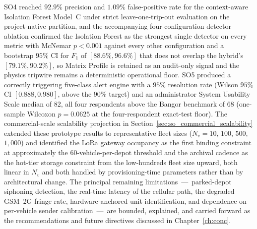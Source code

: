 SO4 reached $92.9\%$ precision and $1.09\%$ false-positive rate for the context-aware Isolation Forest Model~C under strict leave-one-trip-out evaluation on the project-native partition, and the accompanying four-configuration detector ablation confirmed the Isolation Forest as the strongest single detector on every metric with McNemar $p < 0.001$ against every other configuration and a bootstrap $95\%$ CI for $F_1$ of $[88.6\%, 96.6\%]$ that does not overlap the hybrid's $[79.1\%, 90.2\%]$, so Matrix Profile is retained as an audit-only signal and the physics tripwire remains a deterministic operational floor. SO5 produced a correctly triggering five-class alert engine with a $95\%$ resolution rate (Wilson $95\%$ CI $[0.888, 0.980]$, above the $90\%$ target) and an administrator System Usability Scale median of $82$, all four respondents above the Bangor benchmark of $68$ (one-sample Wilcoxon $p = 0.0625$ at the four-respondent exact-test floor). The commercial-scale scalability projection in Section~\ref{sec:so_commercial_scalability} extended these prototype results to representative fleet sizes ($N_v = 10$, $100$, $500$, $1{,}000$) and identified the LoRa gateway occupancy as the first binding constraint at approximately the 60-vehicle-per-depot threshold and the archival cadence as the hot-tier storage constraint from the low-hundreds fleet size upward, both linear in $N_v$ and both handled by provisioning-time parameters rather than by architectural change. The principal remaining limitations~---~parked-depot siphoning detection, the real-time latency of the cellular path, the degraded GSM~2G fringe rate, hardware-anchored unit identification, and dependence on per-vehicle sender calibration~---~are bounded, explained, and carried forward as the recommendations and future directives discussed in Chapter~\ref{ch:conc}.
